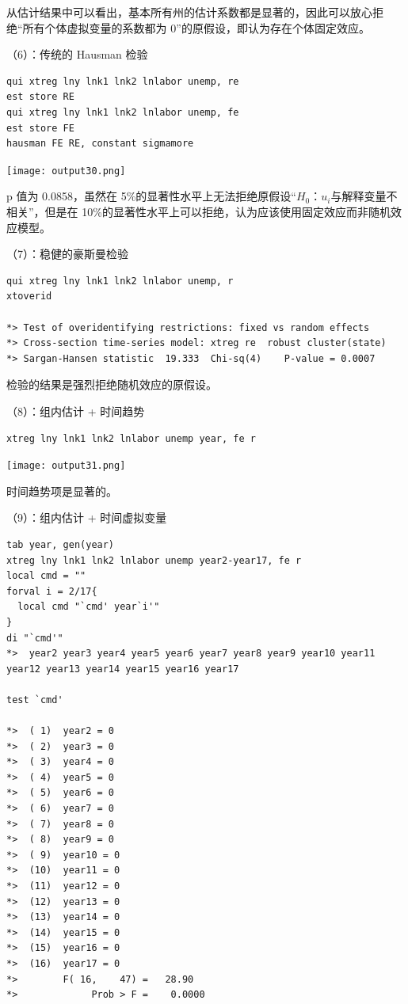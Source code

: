 \documentclass[cn,fancy,blue,11pt]{elegantbook}
\begin{document}
从估计结果中可以看出，基本所有州的估计系数都是显著的，因此可以放心拒绝``所有个体虚拟变量的系数都为 0''的原假设，即认为存在个体固定效应。

（6）：传统的 Hausman 检验

\begin{lstlisting}
qui xtreg lny lnk1 lnk2 lnlabor unemp, re
est store RE
qui xtreg lny lnk1 lnk2 lnlabor unemp, fe
est store FE
hausman FE RE, constant sigmamore
\end{lstlisting}

\noindent\texttt{[image: output30.png]}

p 值为 0.0858，虽然在 5\%的显著性水平上无法拒绝原假设``\(H_0：u_i\)与解释变量不相关''，但是在 10\%的显著性水平上可以拒绝，认为应该使用固定效应而非随机效应模型。

（7）：稳健的豪斯曼检验

\begin{lstlisting}
qui xtreg lny lnk1 lnk2 lnlabor unemp, r
xtoverid

*> Test of overidentifying restrictions: fixed vs random effects
*> Cross-section time-series model: xtreg re  robust cluster(state)
*> Sargan-Hansen statistic  19.333  Chi-sq(4)    P-value = 0.0007
\end{lstlisting}

检验的结果是强烈拒绝随机效应的原假设。

（8）：组内估计 + 时间趋势

\begin{lstlisting}
xtreg lny lnk1 lnk2 lnlabor unemp year, fe r
\end{lstlisting}

\noindent\texttt{[image: output31.png]}

时间趋势项是显著的。

（9）：组内估计 + 时间虚拟变量

\begin{lstlisting}
tab year, gen(year)
xtreg lny lnk1 lnk2 lnlabor unemp year2-year17, fe r
local cmd = ""
forval i = 2/17{
  local cmd "`cmd' year`i'"
}
di "`cmd'"
*>  year2 year3 year4 year5 year6 year7 year8 year9 year10 year11 year12 year13 year14 year15 year16 year17

test `cmd'

*>  ( 1)  year2 = 0
*>  ( 2)  year3 = 0
*>  ( 3)  year4 = 0
*>  ( 4)  year5 = 0
*>  ( 5)  year6 = 0
*>  ( 6)  year7 = 0
*>  ( 7)  year8 = 0
*>  ( 8)  year9 = 0
*>  ( 9)  year10 = 0
*>  (10)  year11 = 0
*>  (11)  year12 = 0
*>  (12)  year13 = 0
*>  (13)  year14 = 0
*>  (14)  year15 = 0
*>  (15)  year16 = 0
*>  (16)  year17 = 0
*>        F( 16,    47) =   28.90
*>             Prob > F =    0.0000
\end{lstlisting}
\end{document}
